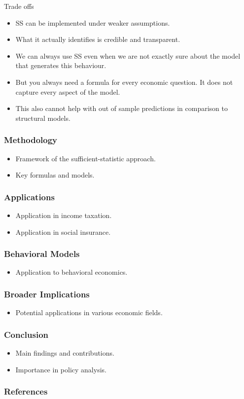 \documentclass{beamer}
\begin{document}
\begin{frame}{Trade offs}
\begin{itemize}
    \item SS can be implemented under weaker assumptions. 
    \item What it actually identifies is credible and transparent. 
    \item We can always use SS even when we are not exactly sure about the model that generates this behaviour. 
    \item But you always need a formula for every economic question. It does not capture every aspect of the model. 
    \item This also cannot help with out of sample predictions in comparison to structural models.
\end{itemize}    
\end{frame}

\begin{frame}
\frametitle{Methodology}
\begin{itemize}
    \item Framework of the sufficient-statistic approach.
    \item Key formulas and models.
\end{itemize}
\end{frame}

\begin{frame}
\frametitle{Applications}
\begin{itemize}
    \item Application in income taxation.
    \item Application in social insurance.
\end{itemize}
\end{frame}

\begin{frame}
\frametitle{Behavioral Models}
\begin{itemize}
    \item Application to behavioral economics.
\end{itemize}
\end{frame}

\begin{frame}
\frametitle{Broader Implications}
\begin{itemize}
    \item Potential applications in various economic fields.
\end{itemize}
\end{frame}

\begin{frame}
\frametitle{Conclusion}
\begin{itemize}
    \item Main findings and contributions.
    \item Importance in policy analysis.
\end{itemize}
\end{frame}

\begin{frame}
\frametitle{References}
\end{frame}
\end{document}
